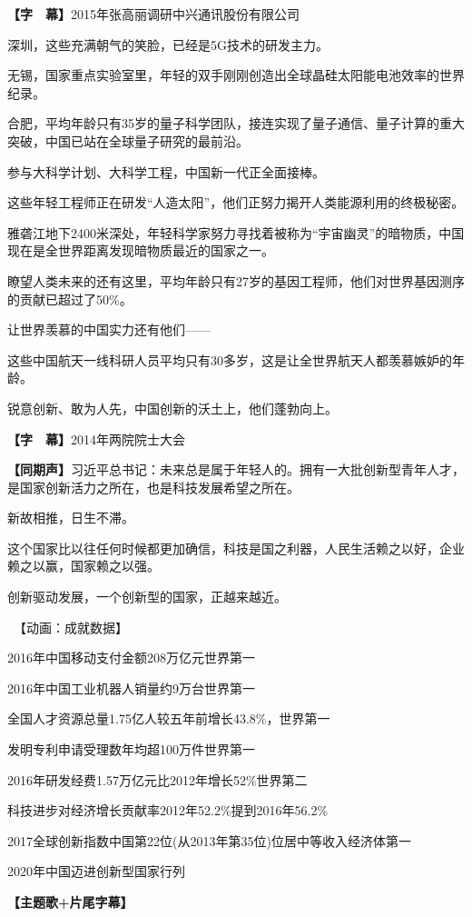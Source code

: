 \documentclass{ctexart}
\newcommand{\zkh}[1]{\textbf{\hspace{-2.7em} 【#1】}}
\begin{document}
 \zkh{字　幕}2015年张高丽调研中兴通讯股份有限公司

 深圳，这些充满朝气的笑脸，已经是5G技术的研发主力。

无锡，国家重点实验室里，年轻的双手刚刚创造出全球晶硅太阳能电池效率的世界纪录。

合肥，平均年龄只有35岁的量子科学团队，接连实现了量子通信、量子计算的重大突破，中国已站在全球量子研究的最前沿。

 参与大科学计划、大科学工程，中国新一代正全面接棒。

 这些年轻工程师正在研发``人造太阳''，他们正努力揭开人类能源利用的终极秘密。

雅砻江地下2400米深处，年轻科学家努力寻找着被称为``宇宙幽灵''的暗物质，中国现在是全世界距离发现暗物质最近的国家之一。

瞭望人类未来的还有这里，平均年龄只有27岁的基因工程师，他们对世界基因测序的贡献已超过了50{\%}。

 让世界羡慕的中国实力还有他们------

这些中国航天一线科研人员平均只有30多岁，这是让全世界航天人都羡慕嫉妒的年龄。

 锐意创新、敢为人先，中国创新的沃土上，他们蓬勃向上。

 \zkh{字　幕}2014年两院院士大会

 \zkh{同期声}习近平总书记：未来总是属于年轻人的。拥有一大批创新型青年人才，是国家创新活力之所在，也是科技发展希望之所在。

 新故相推，日生不滞。

这个国家比以往任何时候都更加确信，科技是国之利器，人民生活赖之以好，企业赖之以赢，国家赖之以强。

 创新驱动发展，一个创新型的国家，正越来越近。

 　【动画：成就数据】
 
 2016年中国移动支付金额208万亿元世界第一

 2016年中国工业机器人销量约9万台世界第一

 全国人才资源总量1.75亿人较五年前增长43.8{\%}，世界第一

 发明专利申请受理数年均超100万件世界第一

 2016年研发经费1.57万亿元比2012年增长52{\%}世界第二

 科技进步对经济增长贡献率2012年52.2{\%}提到2016年56.2{\%}

 2017全球创新指数中国第22位(从2013年第35位)位居中等收入经济体第一

2020年中国迈进创新型国家行列

\zkh{主题歌+片尾字幕}
\end{document}
